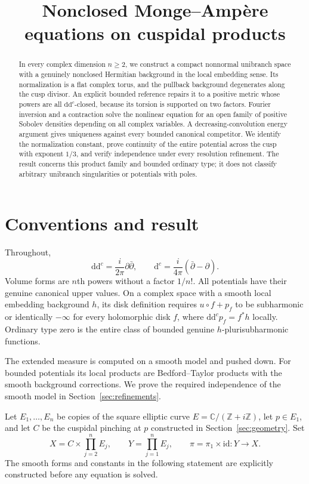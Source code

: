 \documentclass[11pt]{article}
\title{Nonclosed Monge--Amp\`ere equations on cuspidal products}
\author{}
\date{}
\newcommand{\ddc}{\mathrm{d}\mathrm{d}^c}
\newcommand{\dc}{\mathrm{d}^c}
\begin{document}
\maketitle
\begin{abstract}
In every complex dimension $n\ge2$, we construct a compact nonnormal
unibranch space with a genuinely nonclosed Hermitian background in the local
embedding sense. Its normalization is a flat
complex torus, and the pullback background degenerates along the cusp divisor.
An explicit bounded reference repairs it to a positive metric whose powers
are all $\ddc$-closed, because its torsion is supported on two factors.
Fourier inversion and a contraction solve the nonlinear equation for an open
family of positive Sobolev densities depending on all complex variables.
A decreasing-convolution energy argument gives uniqueness against every
bounded canonical competitor. We identify the normalization constant, prove
continuity of the entire potential across the cusp with exponent $1/3$, and
verify independence under every resolution refinement. The result concerns
this product family and bounded ordinary type; it does not classify arbitrary
unibranch singularities or potentials with poles.
\end{abstract}

\section{Conventions and result}

Throughout,
\[
 \ddc=\frac{i}{2\pi}\partial\bar\partial,
 \qquad \dc=\frac{i}{4\pi}(\bar\partial-\partial).
\]
Volume forms are $n$th powers without a factor $1/n!$.
All potentials have their genuine canonical upper values. On a complex space
with a smooth local embedding background $h$, its disk definition requires
$u\circ f+p_f$ to be subharmonic or identically $-\infty$ for every
holomorphic disk $f$, where $\ddc p_f=f^*h$ locally. Ordinary type zero is the
entire class of bounded genuine $h$-plurisubharmonic functions.

The extended measure is computed on a smooth model and pushed down.
For bounded potentials its local products are Bedford--Taylor products with
the smooth background corrections. We prove the required independence of
the smooth model in Section~\ref{sec:refinements}.

Let $E_1,\ldots,E_n$ be copies of the square elliptic curve
$E=\mathbb C/(\mathbb Z+i\mathbb Z)$, let $p\in E_1$, and let $C$ be the cuspidal
pinching at $p$ constructed in Section~\ref{sec:geometry}. Set
\[
 X=C\times\prod_{j=2}^n E_j,\qquad Y=\prod_{j=1}^n E_j,\qquad
 \pi=\pi_1\times\mathrm{id}:Y\longrightarrow X.
\]
The smooth forms and constants in the following statement are explicitly
constructed before any equation is solved.
\end{document}
